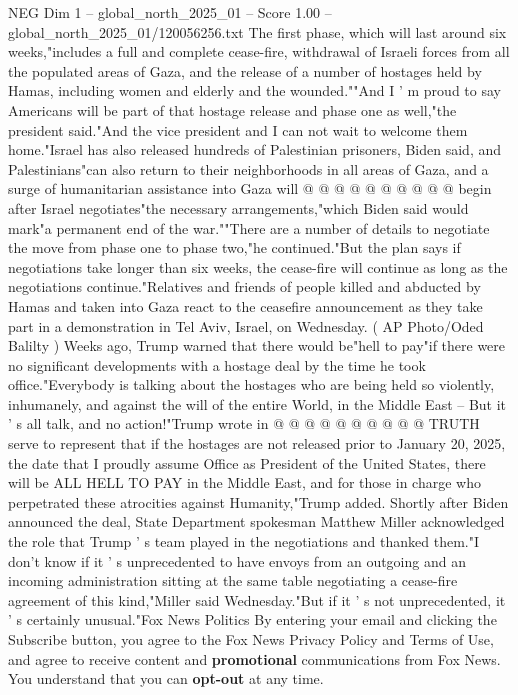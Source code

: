 \begin{textsample}{NEG Dim 1 – global\_north\_2025\_01 – Score 1.00 – global\_north\_2025\_01/120056256.txt}
The first phase, which will last around six weeks,"includes a full and complete cease-fire, withdrawal of Israeli forces from all the populated areas of Gaza, and the release of a number of hostages held by Hamas, including women and elderly and the wounded.""And I ' m proud to say Americans will be part of that hostage release and phase one as well,"the president said."And the vice president and I can not wait to welcome them home."Israel has also released hundreds of Palestinian prisoners, Biden said, and Palestinians"can also return to their neighborhoods in all areas of Gaza, and a surge of humanitarian assistance into Gaza will @ @ @ @ @ @ @ @ @ @ begin after Israel negotiates"the necessary arrangements,"which Biden said would mark"a permanent end of the war.""There are a number of details to negotiate the move from phase one to phase two,"he continued."But the plan says if negotiations take longer than six weeks, the cease-fire will continue as long as the negotiations continue."Relatives and friends of people killed and abducted by Hamas and taken into Gaza react to the ceasefire announcement as they take part in a demonstration in Tel Aviv, Israel, on Wednesday. ( AP Photo/Oded Balilty ) Weeks ago, Trump warned that there would be"hell to pay"if there were no significant developments with a hostage deal by the time he took office."Everybody is talking about the hostages who are being held so violently, inhumanely, and against the will of the entire World, in the Middle East -- But it ' s all talk, and no action!"Trump wrote in @ @ @ @ @ @ @ @ @ @ TRUTH serve to represent that if the hostages are not released prior to January 20, 2025, the date that I proudly assume Office as President of the United States, there will be ALL HELL TO PAY in the Middle East, and for those in charge who perpetrated these atrocities against Humanity,"Trump added.
Shortly after Biden announced the deal, State Department spokesman Matthew Miller acknowledged the role that Trump ' s team played in the negotiations and thanked them."I don't know if it ' s unprecedented to have envoys from an outgoing and an incoming administration sitting at the same table negotiating a cease-fire agreement of this kind,"Miller said Wednesday."But if it ' s not unprecedented, it ' s certainly unusual."Fox News Politics By entering your email and clicking the Subscribe button, you agree to the Fox News Privacy Policy and Terms of Use, and agree to receive content and \textbf{promotional} communications from Fox News.
You understand that you can \textbf{opt-out} at any time.

\end{textsample}
